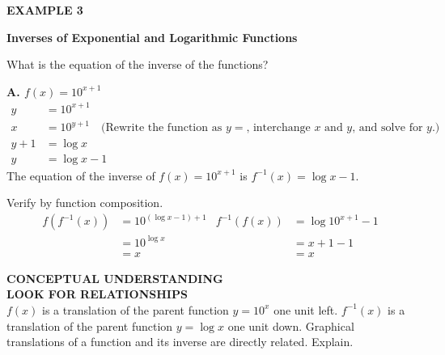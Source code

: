 \documentclass{article}
\newenvironment{concept-box}{}{}
\newenvironment{example}[1]{\textbf{EXAMPLE #1}\par}{\par}
\begin{document}
\begin{example}{3}
\textbf{Inverses of Exponential and Logarithmic Functions}

What is the equation of the inverse of the functions?

\textbf{A. $f(x) = 10^{x+1}$}
\begin{align*}
y &= 10^{x+1} \\
x &= 10^{y+1} \quad \text{(Rewrite the function as $y=$, interchange $x$ and $y$, and solve for $y$.)} \\
y + 1 &= \log x \\
y &= \log x - 1
\end{align*}
The equation of the inverse of $f(x) = 10^{x+1}$ is $f^{-1}(x) = \log x - 1$.

Verify by function composition.
\begin{align*}
f(f^{-1}(x)) &= 10^{(\log x - 1) + 1} & f^{-1}(f(x)) &= \log 10^{x+1} - 1 \\
&= 10^{\log x} & &= x + 1 - 1 \\
&= x & &= x
\end{align*}

\begin{center}
\end{center}

\begin{concept-box}
\textbf{CONCEPTUAL UNDERSTANDING} \\
\textbf{LOOK FOR RELATIONSHIPS} \\
$f(x)$ is a translation of the parent function $y = 10^x$ one unit left. $f^{-1}(x)$ is a translation of the parent function $y = \log x$ one unit down. Graphical translations of a function and its inverse are directly related. Explain.
\end{concept-box}


\end{example}
\end{document}
